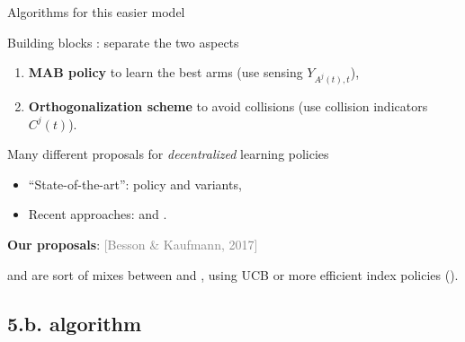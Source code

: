\documentclass[12pt,english,ignorenonframetext,aspectratio=169,]{beamer}
\providecommand{\tightlist}{%
  \setlength{\itemsep}{0pt}\setlength{\parskip}{0pt}}
\begin{document}
\begin{frame}{Algorithms for this easier model}

\begin{block}{Building blocks : separate the two aspects}

\begin{enumerate}
\def\labelenumi{\arabic{enumi}.}
\tightlist
\item
  \textbf{MAB policy} to learn the best arms (use sensing
  \(Y_{A^j(t),t}\)),
\item
  \textbf{Orthogonalization scheme} to avoid collisions (use collision indicators
  \(C^j(t)\)).
\end{enumerate}

\pause

\end{block}

\begin{block}{Many different proposals for \emph{decentralized} learning
policies}

\begin{itemize}
\tightlist
\item
  ``State-of-the-art'': \rhoRand{} policy and variants,
  \citationright{[Anandkumar et al, 2011]}
\item
  Recent approaches: \MEGA{} and \MusicalChair{}.
\end{itemize}

\pause

\end{block}

\begin{block}{\textbf{Our proposals}:
\hfill{}\textcolor{gray}{[Besson \& Kaufmann, 2017]}}

  \RandTopM{} and \MCTopM{} are sort of mixes
  between \rhoRand{} and \MusicalChair, using UCB or more
  efficient index policies (\klUCB).

\end{block}

\end{frame}



\subsection{\hfill{}5.b. \RandTopM{} algorithm\hfill{}}
\end{document}
